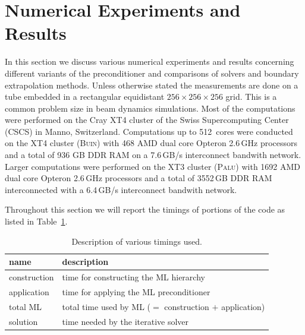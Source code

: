 \section{Numerical Experiments and Results}
\label{sec:results}

In this section we discuss various numerical experiments and results
concerning different variants of the preconditioner and comparisons of
solvers and boundary extrapolation methods.  Unless otherwise stated the
measurements are done on a tube embedded in a rectangular equidistant
$256\times256\times256$ grid.  This is a common problem size in beam
dynamics simulations.  Most of the computations were performed on the
Cray XT4 cluster of the Swiss Supercomputing Center (CSCS) in Manno,
Switzerland. Computations up to 512~cores were conducted on the XT4
cluster (\textsc{Buin}) with 468 AMD dual core Opteron 2.6\,GHz
processors and a total of 936 GB DDR RAM on a 7.6\,GB/s interconnect
bandwith network.  Larger computations were performed on the XT3 cluster
(\textsc{Palu}) with 1692 AMD dual core Opteron 2.6\,GHz processors and a
total of 3552\,GB DDR RAM interconnected with a 6.4\,GB/s interconnect
bandwith network.

Throughout this section we will report the timings of portions of the
code as listed in Table~\ref{tbl:timings_description}.
\begin{table}[ht]
  \begin{center}
    \begin{tabular}{ll}
      \hline
      name & description \\
      \hline
      construction & time for constructing the ML hierarchy \\
      application  & time for applying the ML preconditioner \\
      total ML     & total time used by ML ($=$ construction $+$ application) \\
      solution     & time needed by the iterative solver \\
      \hline
    \end{tabular}
    \caption{Description of various timings used.}
    \label{tbl:timings_description}
  \end{center}
\end{table}

